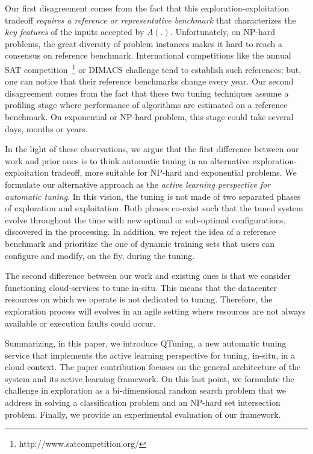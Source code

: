 \documentclass[10pt, conference, compsocconf]{IEEEtran}
\begin{document}
Our first disagreement comes from the fact that this exploration-exploitation tradeoff {\it requires a reference or representative 
benchmark} that characterizes the {\it key features} of the inputs accepted by  $A(.)$. Unfortunately, on NP-hard problems, the great 
diversity of problem instances makes it hard to reach a consensus on reference benchmark. International competitions like the annual SAT 
competition~\footnote{http://www.satcompetition.org/} or DIMACS challenge tend to establish such references; but, one can notice 
that their reference benchmarks change every year. 
Our second disagreement comes from the fact that these two tuning techniques assume a profiling stage where performance of 
algorithms are estimated on a reference benchmark. On exponential or NP-hard problem, this stage could take several days, 
months or years. 


In the light of these observations, we argue that the first difference between our work and prior ones is to think 
automatic tuning in an alternative exploration-exploitation tradeoff, more suitable for NP-hard and exponential problems. 
We formulate our alternative approach as the {\it active learning perspective for automatic tuning}. 
In this vision, the tuning is not made of two separated phases of exploration and exploitation. Both phases co-exist 
such that the tuned system evolve throughout the time with new optimal or sub-optimal configurations, discovered in the processing. 
In addition, we reject the idea of a reference benchmark and prioritize the one of dynamic training sets that users 
can configure and modify, on the fly, during the tuning. 

The second difference between our work and existing ones is that we consider functioning cloud-services to tune in-situ. 
This means that the datacenter resources on which we operate is not dedicated to tuning. Therefore, the exploration process will  
evolves in an agile setting where resources are not always available or execution faults could occur. 

Summarizing, in this paper, we introduce QTuning, a new automatic tuning service that implements the active 
learning perspective for tuning, in-situ, in a cloud context. The paper contribution focuses on the general 
architecture of the system and its active learning framework. On this last point, we formulate the challenge in 
exploration as a bi-dimensional random search problem that we address in solving a classification problem and 
an NP-hard set intersection problem.  Finally, we provide an experimental evaluation of our framework.
\end{document}
